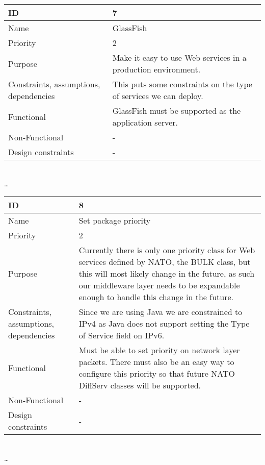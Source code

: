 \begin{center}
	\begin{tabular}{| p{4cm} | p{8cm} |}
		\hline
		ID & 7 \\
		\hline
		Name & GlassFish \\
		\hline
		Priority & 2 \\
		\hline
		Purpose & Make it easy to use Web services in a production environment. \\
		\hline 
		Constraints, assumptions, dependencies & This puts some constraints on the type of services we can deploy. \\
		\hline  
		Functional & GlassFish must be supported as the application server.  \\
		\hline
		Non-Functional & - \\ 
		\hline
		Design constraints & - \\
		\hline
	\end{tabular}
	\\  \ldots  \\

	\begin{tabular}{| p{4cm} | p{8cm} |}
		\hline
		ID & 8 \\
		\hline
		Name & Set package priority \\
		\hline
		Priority & 2 \\
		\hline
		Purpose & Currently there is only one priority class for Web services defined by NATO, the BULK class, but this will most likely change in the future, as such our middleware layer needs to be expandable enough to handle this change in the future. \\
		\hline 
		Constraints, assumptions, dependencies & Since we are using Java we are constrained to IPv4 as Java does not support setting the Type of Service field on IPv6.\\
		\hline  
		Functional & Must be able to set priority on network layer packets. There must also be an easy way to configure this priority so that future NATO DiffServ classes will be supported. \\
		\hline
		Non-Functional & -\\ 
		\hline
		Design constraints & - \\
		\hline
	\end{tabular}
	\\  \ldots  \\


\end{center}
